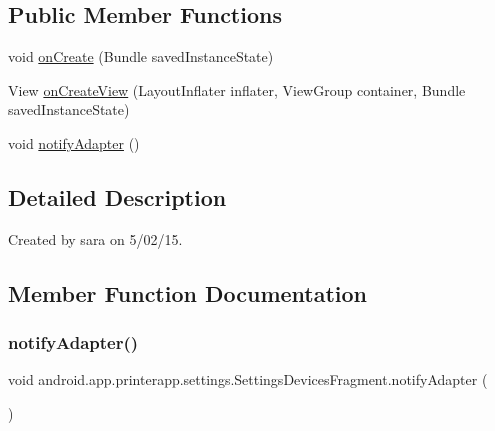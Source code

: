 \subsection*{Public Member Functions}
\begin{DoxyCompactItemize}
\item 
void \hyperlink{classandroid_1_1app_1_1printerapp_1_1settings_1_1_settings_devices_fragment_a0f39f3786e68d51fe9712ed9f3fa6251}{on\+Create} (Bundle saved\+Instance\+State)
\item 
View \hyperlink{classandroid_1_1app_1_1printerapp_1_1settings_1_1_settings_devices_fragment_aacbbd49289bc4b1404ec9b230cf6fc18}{on\+Create\+View} (Layout\+Inflater inflater, View\+Group container, Bundle saved\+Instance\+State)
\item 
void \hyperlink{classandroid_1_1app_1_1printerapp_1_1settings_1_1_settings_devices_fragment_a60847b0196d236e7cc180bf8258d16bc}{notify\+Adapter} ()
\end{DoxyCompactItemize}


\subsection{Detailed Description}
Created by sara on 5/02/15. 

\subsection{Member Function Documentation}
\mbox{\label{classandroid_1_1app_1_1printerapp_1_1settings_1_1_settings_devices_fragment_a60847b0196d236e7cc180bf8258d16bc}} 
\subsubsection{\texorpdfstring{notify\+Adapter()}{notifyAdapter()}}
{\footnotesize\ttfamily void android.\+app.\+printerapp.\+settings.\+Settings\+Devices\+Fragment.\+notify\+Adapter (\begin{DoxyParamCaption}{ }\end{DoxyParamCaption})}

